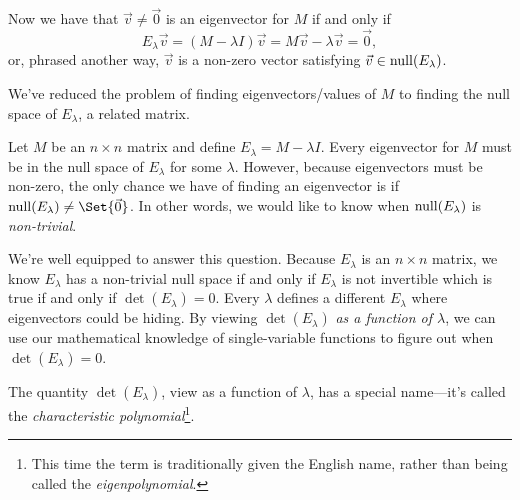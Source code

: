 Now we have that $\vec v\neq \vec 0$ is an eigenvector for $M$ if and only if
\[
	E_\lambda \vec v=(M-\lambda I)\vec v = M\vec v-\lambda \vec v=\vec 0,
\]
or, phrased another way, $\vec v$ is a non-zero vector satisfying $\vec v\in \operatorname{null}(E_\lambda)$.

We've reduced the problem of finding eigenvectors/values of $M$ to finding the null space of $E_\lambda$,
a related matrix.


Let $M$ be an $n\times n$ matrix and define $E_\lambda=M-\lambda I$. Every eigenvector for
$M$ must be in the null space of $E_\lambda$ for some $\lambda$. However, because eigenvectors
must be non-zero, the only chance we have of finding an eigenvector is if $\Null(E_\lambda)\neq \Set{\vec 0}$.
In other words, we would like to know when $\operatorname{null}(E_\lambda)$ is \emph{non-trivial}.

We're well equipped to answer this question. Because $E_\lambda$ is an $n\times n$ matrix, we know $E_\lambda$ has
a non-trivial null space if and only if $E_\lambda$ is not invertible which is true if and only if $\det(E_\lambda)=0$.
Every $\lambda$ defines a different $E_\lambda$ where eigenvectors could be hiding. By viewing $\det(E_\lambda)$
\emph{as a function of $\lambda$}, we can use our mathematical knowledge of single-variable functions to 
figure out when $\det(E_\lambda)=0$.

The quantity $\det(E_\lambda)$, view as a function of $\lambda$, has a special name---it's
called the \emph{characteristic polynomial}\footnote{ This time the term is traditionally given the English name, rather
than being called the \emph{eigenpolynomial}.}.


